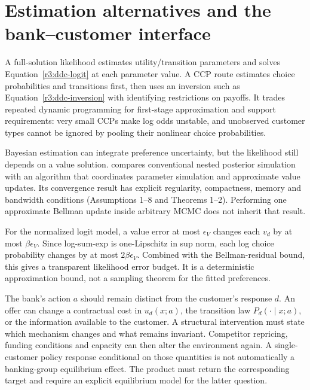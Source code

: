 \section{Estimation alternatives and the bank--customer interface}
\label{r3:choice-estimation}
A full-solution likelihood estimates utility/transition parameters and
solves Equation~\eqref{r3:ddc-logit} at each parameter value. A CCP
route estimates choice probabilities and transitions first, then uses
an inversion such as Equation~\eqref{r3:ddc-inversion} with identifying
restrictions on payoffs. It trades repeated dynamic programming for
first-stage approximation and support requirements: very small CCPs
make log odds unstable, and unobserved customer types cannot be ignored
by pooling their nonlinear choice probabilities.

Bayesian estimation can integrate preference uncertainty, but the
likelihood still depends on a value solution. \citet[Sections 2.2--2.3]{imai2009}
compares conventional nested posterior simulation with an algorithm
that coordinates parameter simulation and approximate value updates.
Its convergence result has explicit regularity, compactness, memory
and bandwidth conditions (Assumptions 1--8 and Theorems 1--2).
Performing one approximate Bellman update inside arbitrary MCMC does
not inherit that result.

For the normalized logit model, a value error at most $\epsilon_V$
changes each $v_d$ by at most $\beta\epsilon_V$. Since log-sum-exp
is one-Lipschitz in sup norm, each log choice probability changes by
at most $2\beta\epsilon_V$. Combined with the Bellman-residual bound,
this gives a transparent likelihood error budget. It is a deterministic
approximation bound, not a sampling theorem for the fitted preferences.

The bank's action $a$ should remain distinct from the customer's
response $d$. An offer can change a contractual cost in $u_d(x;a)$,
the transition law $P_d(\cdot\mid x;a)$, or the information available
to the customer. A structural intervention must state which mechanism
changes and what remains invariant. Competitor repricing, funding
conditions and capacity can then alter the environment again. A
single-customer policy response conditional on those quantities is
not automatically a banking-group equilibrium effect. The product
must return the corresponding target and require an explicit equilibrium
model for the latter question.



